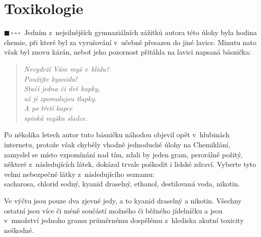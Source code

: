 \documentclass{book}
\newcommand{\jeden}{$\blacksquare \, \square \, \square \, \square \; \; $}
\renewenvironment{quotation}{\par}{\par} %
\begin{document}
\section{Toxikologie}

\begin{quotation}
\jeden Jedním z~nejsilnějších gymnaziálních zážitků autora této úlohy byla
hodina chemie, při které byl za vyrušování v~učebně přesazen do jiné
lavice. Minutu nato však byl znovu kárán, neboť jeho pozornost přitáhla
na lavici napsaná básnička: 
\begin{verse}
\textit{Nevydrží Vám myš v~klidu? }\\
 \textit{Použijte kyanidu! }\\
 \textit{Stačí jedna či dvě kapky, }\\
 \textit{už jí zpomalujou tlapky. }\\
 \textit{A po třetí kapce }\\
 \textit{spinká myška sladce.}
\end{verse}
Po několika letech autor tuto básničku náhodou objevil opět v~hlubinách
internetu, protože však chyběly vhodně jednoduché úlohy na Chemiklání,
zamyslel se místo vzpomínání nad tím, zdali by jeden gram, perorálně
požitý, některé z~následujících látek, dokázal trvale poškodit i
lidské zdraví. Vyberte tyto velmi nebezpečné látky z~následujícího
seznamu:\\sacharosa, chlorid sodný, kyanid draselný, ethanol, destilovaná
voda, nikotin.
\end{quotation} \dotfill \par 
Ve výčtu jsou pouze dva zjevné jedy, a to kyanid draselný a nikotin.
Všechny ostatní jsou více či méně součástí možného či běžného jídelníčku a jsou v~množství jednoho gramu průměrnému dospělému z~hlediska akutní toxicity neškodné.
\end{document}
